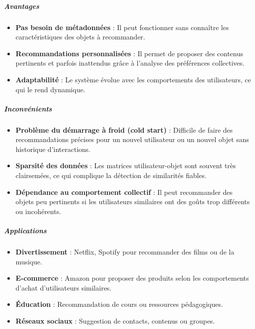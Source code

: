 \documentclass{article}
\begin{document}
\subparagraph{Avantages}
\begin{itemize}
    \item \textbf{Pas besoin de métadonnées} : Il peut fonctionner sans connaître les caractéristiques des objets à recommander.
    \item \textbf{Recommandations personnalisées} : Il permet de proposer des contenus pertinents et parfois inattendus grâce à l’analyse des préférences collectives.
    \item \textbf{Adaptabilité} : Le système évolue avec les comportements des utilisateurs, ce qui le rend dynamique.
\end{itemize}

\subparagraph{Inconvénients}
\begin{itemize}
    \item \textbf{Problème du démarrage à froid (cold start)} : Difficile de faire des recommandations précises pour un nouvel utilisateur ou un nouvel objet sans historique d'interactions.
    \item \textbf{Sparsité des données} : Les matrices utilisateur-objet sont souvent très clairsemées, ce qui complique la détection de similarités fiables.
    \item \textbf{Dépendance au comportement collectif} : Il peut recommander des objets peu pertinents si les utilisateurs similaires ont des goûts trop différents ou incohérents.
\end{itemize}

\subparagraph{Applications}
\begin{itemize}
    \item \textbf{Divertissement} : Netflix, Spotify pour recommander des films ou de la musique.
    \item \textbf{E-commerce} : Amazon pour proposer des produits selon les comportements d’achat d’utilisateurs similaires.
    \item \textbf{Éducation} : Recommandation de cours ou ressources pédagogiques.
    \item \textbf{Réseaux sociaux} : Suggestion de contacts, contenus ou groupes.
\end{itemize}
\end{document}
